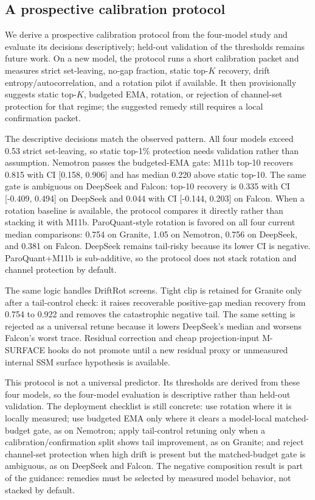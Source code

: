 \subsection{A prospective calibration protocol}
\label{sec:decision-rule}

We derive a prospective calibration protocol from the four-model study and
evaluate its decisions descriptively; held-out validation of the thresholds
remains future work. On a new model, the protocol runs a short calibration
packet and measures strict set-leaving, no-gap fraction, static top-$K$
recovery, drift entropy/autocorrelation, and a rotation pilot if available.
It then provisionally suggests static top-$K$, budgeted EMA, rotation, or
rejection of channel-set protection for that regime; the suggested remedy still
requires a local confirmation packet.

The descriptive decisions match the observed pattern. All four models exceed
0.53 strict set-leaving, so static top-1\% protection needs validation rather
than assumption. Nemotron passes the budgeted-EMA gate: M11b top-10 recovers
0.815 with CI [0.158, 0.906] and has median 0.220 above static top-10. The same
gate is ambiguous on DeepSeek and Falcon: top-10 recovery is 0.335 with CI
[-0.409, 0.494] on DeepSeek and 0.044 with CI [-0.144, 0.203] on Falcon. When
a rotation baseline is available, the protocol compares it directly rather
than stacking it with M11b. ParoQuant-style rotation is favored on all four
current median comparisons: 0.754 on Granite, 1.05 on Nemotron, 0.756 on
DeepSeek, and 0.381 on Falcon. DeepSeek remains tail-risky because its lower
CI is negative. ParoQuant+M11b is sub-additive, so the protocol does not stack
rotation and channel protection by default.

The same logic handles DriftRot screens. Tight clip is retained for Granite
only after a tail-control check: it raises recoverable positive-gap median
recovery from 0.754 to 0.922 and removes the catastrophic negative tail. The
same setting is rejected as a universal retune because it lowers DeepSeek's
median and worsens Falcon's worst trace. Residual correction and cheap
projection-input M-SURFACE hooks do not promote until a new residual proxy or
unmeasured internal SSM surface hypothesis is available.

This protocol is not a universal predictor. Its thresholds are derived from
these four models, so the four-model evaluation is descriptive rather than
held-out validation. The deployment checklist is still concrete: use rotation
where it is locally measured; use budgeted EMA only where it clears a
model-local matched-budget gate, as on Nemotron; apply tail-control retuning
only when a calibration/confirmation split shows tail improvement, as on
Granite; and reject channel-set protection when high drift is present but the
matched-budget gate is ambiguous, as on DeepSeek and Falcon. The negative
composition result is part of the guidance: remedies must be selected by
measured model behavior, not stacked by default.
